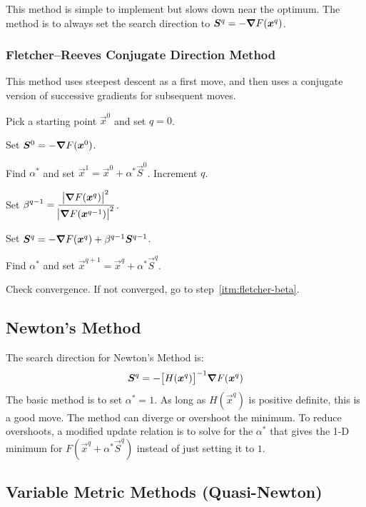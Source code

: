 \documentclass{article}
\begin{document}
This method is simple to implement but slows down near the optimum. The method is to always set the
search direction to \(\bm{S}^q = -\bm{\nabla} F(\bm{x}^q)\).

\subsubsection{Fletcher--Reeves Conjugate Direction Method}

This method uses steepest descent as a first move, and then uses a conjugate version of successive
gradients for subsequent moves.

\begin{enumerate*}
\item Pick a starting point \(\vec{x}^0\) and set \(q = 0\).
\item Set \(\bm{S}^0 = -\bm{\nabla} F(\bm{x}^0)\).
\item Find \(\alpha^*\) and set \(\vec{x}^1 = \vec{x}^0 + \alpha^* \vec{S}^0\). Increment \(q\).
\item \label{itm:fletcher-beta} Set \(\displaystyle \beta^{q-1} = \frac{{\abs{\bm{\nabla} F(\bm{x}^q)}}^2}{{\abs{\bm{\nabla} F(\bm{x}^{q-1})}}^2}\).
\item Set \(\bm{S}^q = -\bm{\nabla} F(\bm{x}^q) + \beta^{q-1} \bm{S}^{q-1}\).
\item Find \(\alpha^*\) and set \(\vec{x}^{q+1} = \vec{x}^q + \alpha^* \vec{S}^q\).
\item Check convergence. If not converged, go to step~\ref{itm:fletcher-beta}.
\end{enumerate*}

\subsection{Newton's Method}

The search direction for Newton's Method is:
\[\bm{S}^q = -{\left[H(\bm{x}^q)\right]}^{-1} \bm{\nabla} F(\bm{x}^q)\]
The basic method is to set \(\alpha^* = 1\). As long as \(H(\vec{x}^q)\) is positive definite, this
is a good move. The method can diverge or overshoot the minimum. To reduce overshoots, a modified
update relation is to solve for the \(\alpha^*\) that gives the 1-D minimum for \(F(\vec{x}^q +
\alpha^* \vec{S}^q)\) instead of just setting it to \(1\).

\subsection{Variable Metric Methods (Quasi-Newton)}
\end{document}
